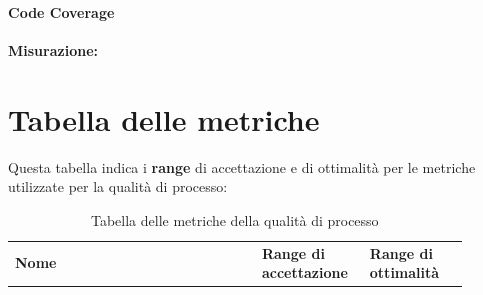 \documentclass[PianoDiQualifica.tex]{subfiles}
\begin{document}
\paragraph{Code Coverage}

\textbf{Misurazione:}



\section{Tabella delle metriche}
Questa tabella indica i \textbf{range} di accettazione e di ottimalità per le metriche utilizzate per la qualità di processo:
\begin{table}[H]
	\begin{center}
		\begin{tabu} to 
			\tableHeaderStyle
			\textbf{Nome} & \textbf{Range di accettazione} & \textbf{Range di ottimalità}\\


		\end{tabu}
		\caption{Tabella delle metriche della qualità di processo}
		\vspace{-1em}
	\end{center}
\end{table}
\end{document}
